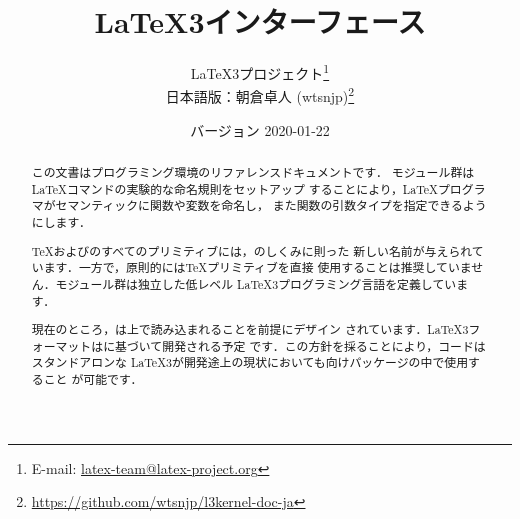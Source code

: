\documentclass[uplatex,dvipdfmx,tombow,kernel]{wtpl3doc}
\begin{document}
\title{\LaTeX3インターフェース}
\author{%
 \LaTeX3プロジェクト\thanks
   {%
     E-mail:
       \href{mailto:latex-team@latex-project.org}
         {latex-team@latex-project.org}%
   }\\
 日本語版：朝倉卓人 (wtsnjp)\thanks
   {\url{https://github.com/wtsnjp/l3kernel-doc-ja}}%
}
\date{バージョン 2020-01-22}

\maketitle

\begin{abstract}

\setlength\parindent{0pt}
\setlength\parskip{\baselineskip}

\noindent
この文書はプログラミング環境のリファレンスドキュメントです．
モジュール群は\LaTeX コマンドの実験的な命名規則をセットアップ
することにより，\LaTeX プログラマがセマンティックに関数や変数を命名し，
また関数の引数タイプを指定できるようにします．

\TeX および\eTeX のすべてのプリミティブには，のしくみに則った
新しい名前が与えられています．一方で，原則的には\TeX プリミティブを直接
使用することは推奨していません．モジュール群は独立した低レベル
\LaTeX3プログラミング言語を定義しています．

現在のところ，は\LaTeXe 上で読み込まれることを前提にデザイン
されています．\LaTeX3フォーマットはに基づいて開発される予定
です．この方針を採ることにより，コードはスタンドアロンな
\LaTeX3が開発途上の現状においても\LaTeXe 向けパッケージの中で使用すること
が可能です．


\end{abstract}
\end{document}

